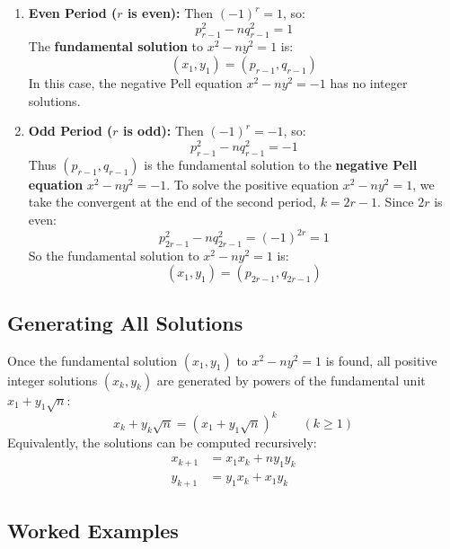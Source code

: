 \documentclass[a4paper]{article}
\begin{document}
\begin{enumerate}
  \item \textbf{Even Period ($r$ is even):}
    Then $(-1)^r = 1$, so:
    \[
      p_{r-1}^2 - n q_{r-1}^2 = 1
    \]
    The \textbf{fundamental solution} to $x^2 - n y^2 = 1$ is:
    \[
      (x_1, y_1) = (p_{r-1}, q_{r-1})
    \]
    In this case, the negative Pell equation $x^2 - n y^2 = -1$ has no integer solutions.

  \item \textbf{Odd Period ($r$ is odd):}
    Then $(-1)^r = -1$, so:
    \[
      p_{r-1}^2 - n q_{r-1}^2 = -1
    \]
    Thus $(p_{r-1}, q_{r-1})$ is the fundamental solution to the \textbf{negative Pell equation} $x^2 - n y^2 = -1$.
    To solve the positive equation $x^2 - n y^2 = 1$, we take the convergent at the end of the second period, $k = 2r - 1$.
    Since $2r$ is even:
    \[
      p_{2r-1}^2 - n q_{2r-1}^2 = (-1)^{2r} = 1
    \]
    So the fundamental solution to $x^2 - n y^2 = 1$ is:
    \[
      (x_1, y_1) = (p_{2r-1}, q_{2r-1})
    \]
\end{enumerate}

\subsection{Generating All Solutions}
Once the fundamental solution $(x_1, y_1)$ to $x^2 - n y^2 = 1$ is found, all positive integer solutions $(x_k, y_k)$ are generated by powers of the fundamental unit $x_1 + y_1\sqrt{n}$:
\[
  x_k + y_k\sqrt{n} = (x_1 + y_1\sqrt{n})^k \qquad (k \ge 1)
\]
Equivalently, the solutions can be computed recursively:
\begin{align*}
  x_{k+1} & = x_1 x_k + n y_1 y_k \\
  y_{k+1} & = y_1 x_k + x_1 y_k
\end{align*}

\subsection{Worked Examples}
\end{document}
